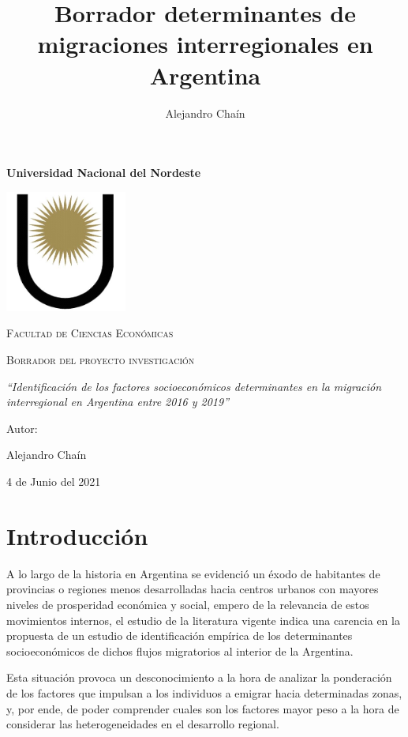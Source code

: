 \documentclass[12pt,a4paper]{article}
\author{Alejandro Chaín}
\title{Borrador determinantes de migraciones interregionales en Argentina}
\begin{document}
\begin{titlepage}
\centering
\vspace{3cm}
{\bfseries\LARGE Universidad Nacional del Nordeste\par}
\vspace{1cm}
{\includegraphics[width=0.3\textwidth]{logounne.png}\par}
{\scshape\Large Facultad de Ciencias Econ\'omicas\par}
\vspace{2cm}
{\scshape\Huge Borrador del proyecto investigación \par}
\vspace{2cm}
{\itshape\Large ``Identificación de los factores socioeconómicos determinantes en la migración
interregional en Argentina entre 2016 y 2019'' \par}
\vfill
{\Large Autor: \par}
{\Large Alejandro Chaín\par}
\vfill
{\Large 4 de Junio del 2021 \par}
\end{titlepage}

\newpage
\tableofcontents
\newpage
\section{Introducción}
A lo largo de la historia en Argentina se evidenció un éxodo de habitantes de provincias o
regiones menos desarrolladas hacia centros urbanos con mayores niveles de prosperidad económica y social, empero de la relevancia de estos movimientos internos, el estudio de la literatura vigente indica una carencia en la propuesta de un estudio de identificación empírica de los determinantes socioeconómicos de dichos flujos migratorios al interior de la Argentina.

Esta situación provoca un desconocimiento a la hora de analizar la ponderación de los factores que impulsan a los individuos a emigrar hacia determinadas zonas, y, por ende, de poder comprender cuales son los factores mayor peso a la hora de considerar las heterogeneidades en el desarrollo regional.
\end{document}
